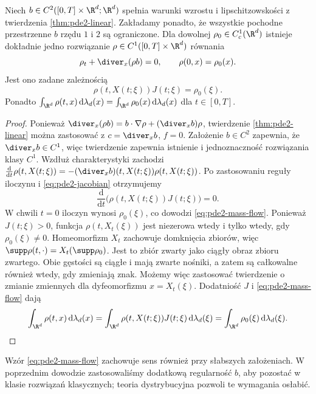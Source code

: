 \begin{twierdzenie}
\label{thm:pde2-mass}
Niech $b\in C^2([0,T]\times\R^d;\R^d)$ spełnia
warunki wzrostu i lipschitzowskości z twierdzenia
\ref{thm:pde2-linear}. Zakładamy ponadto, że wszystkie
pochodne przestrzenne $b$ rzędu $1$ i $2$ są ograniczone.
Dla dowolnej $\rho_0\in C_c^1(\R^d)$ istnieje dokładnie jedno
rozwiązanie $\rho\in C^1([0,T]\times\R^d)$ równania
\[
 \rho_t+\diver_x(\rho b)=0,\qquad \rho(0,x)=\rho_0(x).
\]
Jest ono zadane zależnością
\begin{equation}\label{eq:pde2-mass-flow}
 \rho(t,X(t;\xi))J(t;\xi)=\rho_0(\xi).
\end{equation}
Ponadto $\int_{\R^d}\rho(t,x)\,\mathrm d\lambda_d(x)
=\int_{\R^d}\rho_0(x)\,\mathrm d\lambda_d(x)$ dla $t\in[0,T]$.
\end{twierdzenie}
\begin{proof}
Ponieważ $\diver_x(\rho b)=b\cdot\nabla\rho+
(\diver_xb)\rho$, twierdzenie \ref{thm:pde2-linear}
można zastosować z $c=\diver_xb$, $f=0$.
Założenie $b\in C^2$ zapewnia, że $\diver_x b\in C^1$,
więc twierdzenie zapewnia istnienie i jednoznaczność
rozwiązania klasy $C^1$. Wzdłuż charakterystyki zachodzi
$\frac{\mathrm d}{\mathrm dt}\rho(t,X(t;\xi))
=-(\diver_x b)(t,X(t;\xi))\rho(t,X(t;\xi))$.
Po zastosowaniu reguły iloczynu i \eqref{eq:pde2-jacobian}
otrzymujemy
\[
 \frac{\mathrm d}{\mathrm dt}
 \bigl(\rho(t,X(t;\xi))J(t;\xi)\bigr)=0.
\]
W chwili $t=0$ iloczyn wynosi $\rho_0(\xi)$,
co dowodzi \eqref{eq:pde2-mass-flow}.
Ponieważ $J(t;\xi)>0$, funkcja $\rho(t,X_t(\xi))$
jest niezerowa wtedy i tylko wtedy, gdy $\rho_0(\xi)\ne0$.
Homeomorfizm $X_t$ zachowuje domknięcia zbiorów,
więc $\supp\rho(t,\cdot)=X_t(\supp\rho_0)$.
Jest to zbiór zwarty jako ciągły obraz zbioru zwartego.
Obie gęstości są ciągłe i mają zwarte nośniki,
a zatem są całkowalne również wtedy, gdy zmieniają znak.
Możemy więc zastosować twierdzenie o zmianie zmiennych
dla dyfeomorfizmu $x=X_t(\xi)$.
Dodatniość $J$ i \eqref{eq:pde2-mass-flow} dają
\[
 \int_{\R^d}\rho(t,x)\,\mathrm d\lambda_d(x)
 =\int_{\R^d}\rho(t,X(t;\xi))J(t;\xi)
 \,\mathrm d\lambda_d(\xi)
 =\int_{\R^d}\rho_0(\xi)\,\mathrm d\lambda_d(\xi).
\]
\end{proof}

\begin{uwaga}
Wzór \eqref{eq:pde2-mass-flow} zachowuje sens również
przy słabszych założeniach. W poprzednim dowodzie
zastosowaliśmy dodatkową regularność $b$, aby pozostać
w klasie rozwiązań klasycznych; teoria dystrybucyjna
pozwoli te wymagania osłabić.
\end{uwaga}

